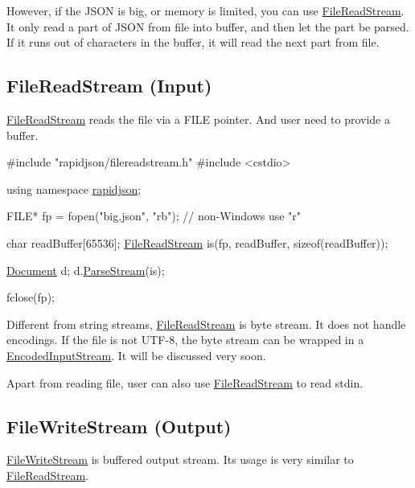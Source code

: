 However, if the J\+S\+ON is big, or memory is limited, you can use {\ttfamily \hyperlink{class_file_read_stream}{File\+Read\+Stream}}. It only read a part of J\+S\+ON from file into buffer, and then let the part be parsed. If it runs out of characters in the buffer, it will read the next part from file.\hypertarget{md_Cadriciel_Commun_Externe_RapidJSON_doc_stream.zh-cn_FileReadStream}{}\subsection{File\+Read\+Stream (\+Input)}\label{md_Cadriciel_Commun_Externe_RapidJSON_doc_stream.zh-cn_FileReadStream}
{\ttfamily \hyperlink{class_file_read_stream}{File\+Read\+Stream}} reads the file via a {\ttfamily F\+I\+LE} pointer. And user need to provide a buffer.


\begin{DoxyCode}
\textcolor{preprocessor}{#include "rapidjson/filereadstream.h"}
\textcolor{preprocessor}{#include <cstdio>}

\textcolor{keyword}{using namespace }\hyperlink{namespacerapidjson}{rapidjson};

FILE* fp = fopen(\textcolor{stringliteral}{"big.json"}, \textcolor{stringliteral}{"rb"}); \textcolor{comment}{// non-Windows use "r"}

\textcolor{keywordtype}{char} readBuffer[65536];
\hyperlink{class_file_read_stream}{FileReadStream} is(fp, readBuffer, \textcolor{keyword}{sizeof}(readBuffer));

\hyperlink{class_generic_document}{Document} d;
d.\hyperlink{class_generic_document_afe94c0abc83a20f2d7dc1ba7677e6238}{ParseStream}(is);

fclose(fp);
\end{DoxyCode}


Different from string streams, {\ttfamily \hyperlink{class_file_read_stream}{File\+Read\+Stream}} is byte stream. It does not handle encodings. If the file is not U\+T\+F-\/8, the byte stream can be wrapped in a {\ttfamily \hyperlink{class_encoded_input_stream}{Encoded\+Input\+Stream}}. It will be discussed very soon.

Apart from reading file, user can also use {\ttfamily \hyperlink{class_file_read_stream}{File\+Read\+Stream}} to read {\ttfamily stdin}.\hypertarget{md_Cadriciel_Commun_Externe_RapidJSON_doc_stream.zh-cn_FileWriteStream}{}\subsection{File\+Write\+Stream (\+Output)}\label{md_Cadriciel_Commun_Externe_RapidJSON_doc_stream.zh-cn_FileWriteStream}
{\ttfamily \hyperlink{class_file_write_stream}{File\+Write\+Stream}} is buffered output stream. Its usage is very similar to {\ttfamily \hyperlink{class_file_read_stream}{File\+Read\+Stream}}.


